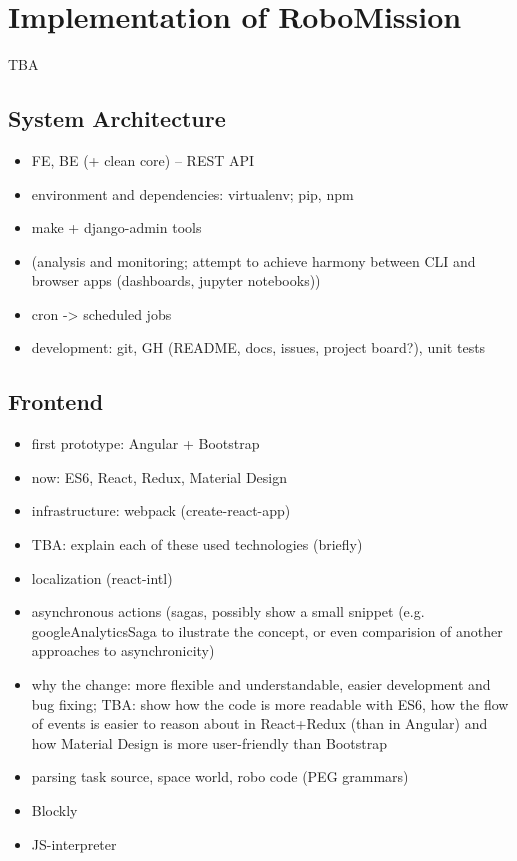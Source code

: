 \chapter{Implementation of RoboMission}
\label{chap:implementation-of-robomission}

TBA

\section{System Architecture}

\begin{itemize}
\item FE, BE (+ clean core) -- REST API
\item environment and dependencies: virtualenv; pip, npm
\item make + django-admin tools
\item (analysis and monitoring; attempt to achieve harmony between CLI and browser apps (dashboards, jupyter notebooks))
\item cron -> scheduled jobs
\item development: git, GH (README, docs, issues, project board?), unit tests
\end{itemize}

\section{Frontend}

\begin{itemize}
\item first prototype: Angular + Bootstrap
\item now: ES6, React, Redux, Material Design
\item infrastructure: webpack (create-react-app)
\item TBA: explain each of these used technologies (briefly)
\item localization (react-intl)
\item asynchronous actions (sagas, possibly show a small snippet (e.g. googleAnalyticsSaga to ilustrate the concept, or even comparision of another approaches to asynchronicity)
\item why the change: more flexible and understandable, easier development and bug fixing; TBA: show how the code is more readable with ES6, how the flow of events is easier to reason about in React+Redux (than in Angular) and how Material Design is more user-friendly than Bootstrap
\item parsing task source, space world, robo code (PEG grammars)
\item Blockly
\item JS-interpreter
\end{itemize}

